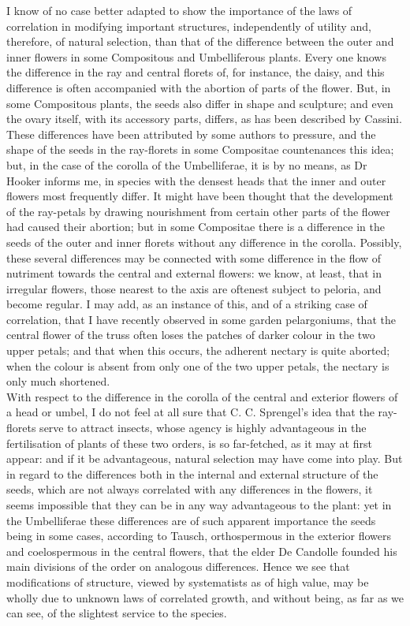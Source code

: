 \indent I know of no case better adapted to show the importance of the laws of correlation in modifying important structures, independently of utility and, therefore, of natural selection, than that of the difference between the outer and inner flowers in some Compositous and Umbelliferous plants. Every one knows the difference in the ray and central florets of, for instance, the daisy, and this difference is often accompanied with the abortion of parts of the flower. But, in some Compositous plants, the seeds also differ in shape and sculpture; and even the ovary itself, with its accessory parts, differs, as has been described by Cassini. These differences have been attributed by some authors to pressure, and the shape of the seeds in the ray-florets in some Compositae countenances this idea; but, in the case of the corolla of the Umbelliferae, it is by no means, as Dr Hooker informs me, in species with the densest heads that the inner and outer flowers most frequently differ. It might have been thought that the development of the ray-petals by drawing nourishment from certain other parts of the flower had caused their abortion; but in some Compositae there is a difference in the seeds of the outer and inner florets without any difference in the corolla. Possibly, these several differences may be connected with some difference in the flow of nutriment towards the central and external flowers: we know, at least, that in irregular flowers, those nearest to the axis are oftenest subject to peloria, and become regular. I may add, as an instance of this, and of a striking case of correlation, that I have recently observed in some garden pelargoniums, that the central flower of the truss often loses the patches of darker colour in the two upper petals; and that when this occurs, the adherent nectary is quite aborted; when the colour is absent from only one of the two upper petals, the nectary is only much shortened.\\
\indent With respect to the difference in the corolla of the central and exterior flowers of a head or umbel, I do not feel at all sure that C. C. Sprengel's idea that the ray-florets serve to attract insects, whose agency is highly advantageous in the fertilisation of plants of these two orders, is so far-fetched, as it may at first appear: and if it be advantageous, natural selection may have come into play. But in regard to the differences both in the internal and external structure of the seeds, which are not always correlated with any differences in the flowers, it seems impossible that they can be in any way advantageous to the plant: yet in the Umbelliferae these differences are of such apparent importance the seeds being in some cases, according to Tausch, orthospermous in the exterior flowers and coelospermous in the central flowers, that the elder De Candolle founded his main divisions of the order on analogous differences. Hence we see that modifications of structure, viewed by systematists as of high value, may be wholly due to unknown laws of correlated growth, and without being, as far as we can see, of the slightest service to the species.\\
